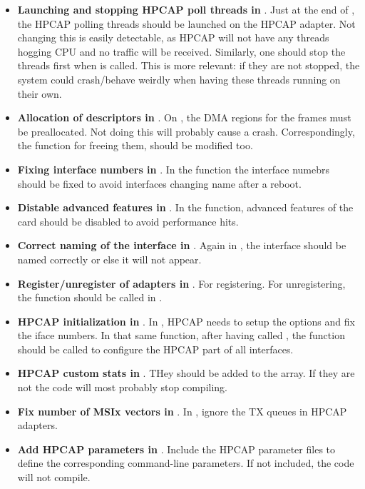 \documentclass[oneside]{hpman}
\begin{document}
\begin{itemize}
	\item \textbf{Launching and stopping HPCAP poll threads in }. Just at the end of , the HPCAP polling threads should be launched on the HPCAP adapter. Not changing this is easily detectable, as HPCAP will not have any threads hogging CPU and no traffic will be received. Similarly, one should stop the threads first when  is called. This is more relevant: if they are not stopped, the system could crash/behave weirdly when having these threads running on their own.
	\item \textbf{Allocation of descriptors in }. On , the DMA regions for the frames must be preallocated. Not doing this will probably cause a crash. Correspondingly, the function for freeing them,  should be modified too.
	\item \textbf{Fixing interface numbers in }. In the  function the interface numebrs should be fixed to avoid interfaces changing name after a reboot.
	\item \textbf{Distable advanced features in }. In the  function, advanced features of the card should be disabled to avoid performance hits.
	\item \textbf{Correct naming of the interface in }. Again in , the interface should be named correctly or else it will not appear.
	\item \textbf{Register/unregister of adapters in }. For registering. For unregistering, the function  should be called in .
	\item \textbf{HPCAP initialization in }. In , HPCAP needs to setup the options and fix the iface numbers. In that same function, after having called , the  function should be called to configure the HPCAP part of all interfaces.
	\item \textbf{HPCAP custom stats in }. THey should be added to the  array. If they are not the code will most probably stop compiling.
	\item \textbf{Fix number of MSIx vectors in }. In , ignore the TX queues in HPCAP adapters.
	\item \textbf{Add HPCAP parameters in }. Include the HPCAP parameter files to define the corresponding command-line parameters. If not included, the code will not compile.
\end{itemize}

\printindex



\end{document}
